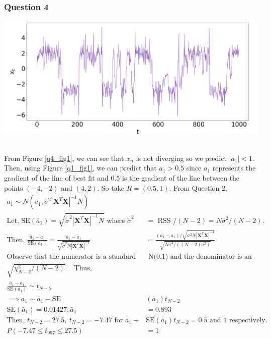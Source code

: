 \documentclass[12pt, a4paper]{article}
\begin{document}
\subsubsection*{Question 4}

\begin{minipage}{\textwidth}
	\centering
	\includegraphics[width = \linewidth]{q4_fig1}
	\label{q4_fig1}
\end{minipage}
\vspace{0.1cm}\\
From Figure \ref{q4_fig1}, we can see that $x_{n}$ is not diverging so we predict $|a_{1}|<1$. Then, using Figure \ref{q1_fig1}, we can predict that $a_{1}>0.5$ since $a_{1}$ represents the gradient of the line of best fit and $0.5$ is the gradient of the line between the points $(-4, -2)$ and $(4, 2)$. %
So take $R = (0.5,1)$. From Question 2,
\begin{align*}
 	\bar{a}_{1} \sim N\left( a_{1}, \sigma^{2}|\bm{X}^{T}\bm{X}|^{-1} N \right) & \\ %
 	\text{Let, SE}(\bar{a}_{1}) = \sqrt{\tilde{\sigma}^{2}|\bm{X}^{T}\bm{X}|^{-1} N} \text{ where } \tilde{\sigma}^{2} & = \text{ RSS }/(N-2) = N\bar{\sigma}^{2}/(N-2). \\
	\text{Then, } \frac{ \bar{a}_{1} - a_{1} }{ \text{SE}(\bar{a}_{1}) } = \frac{ \bar{a}_{1} - a_{1} }{ \sqrt{\tilde{\sigma}^{2} N|\bm{X}^{T}\bm{X}|^{-1}} } & = \frac{ (\bar{a}_{1} - a_{1}) / \sqrt{\sigma^{2} N|\bm{X}^{T}\bm{X}|^{-1}} }{ \sqrt{ N\bar{\sigma}^{2} / ((N-2)\sigma^{2}) } } \\
	\text{Observe that the numerator is a standard normal} & \text{ N(0,1) and the denominator is an independent} \\
	\sqrt{ \chi^{2}_{N-2} / (N-2) }. \text{ ~ Thus, } & \\
	\frac{ \bar{a}_{1} - a_{1} }{ \text{SE}(\bar{a}_{1}) } \sim t_{N-2} & \\
	\implies a_{1} \sim \bar{a}_{1} - \text{SE}&(\bar{a}_{1})t_{N-2} \\
	\text{SE}(\bar{a}_{1}) = 0.01427, \bar{a}_{1} & = 0.893 \\
	\text{Then, } t_{N-2} = 27.5, ~ t_{N-2} = -7.47 \text{ for } \bar{a}_{1} - & \text{SE}(\bar{a}_{1})t_{N-2} = 0.5 \text{ and } 1 \text{ respectively.} \\
	P(-7.47 \leq t_{997} \leq 27.5) & = 1
\end{align*}
\end{document}
